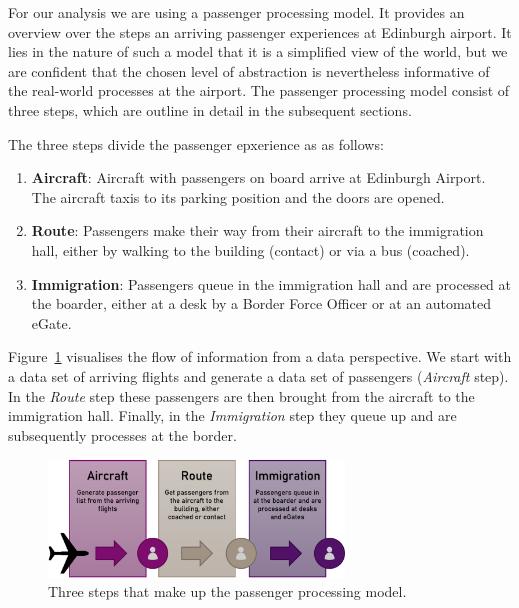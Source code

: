 \documentclass[10pt]{article}
\begin{document}
For our analysis we are using a passenger processing model. It provides an overview over the steps an arriving passenger experiences at Edinburgh airport. It lies in the nature of such a model that it is a simplified view of the world, but we are confident that the chosen level of abstraction is nevertheless informative of the real-world processes at the airport. The passenger processing model consist of three steps, which are outline in detail in the subsequent sections.

The three steps divide the passenger epxerience as as follows:
\begin{enumerate}
    \item \textbf{Aircraft}: Aircraft with passengers on board arrive at Edinburgh Airport. The aircraft taxis to its parking position and the doors are opened. \label{step:aircraft}
    \item \textbf{Route}: Passengers make their way from their aircraft to the immigration hall, either by walking to the building (contact) or via a bus (coached). \label{step:route}
    \item \textbf{Immigration}: Passengers queue in the immigration hall and are processed at the boarder, either at a desk by a Border Force Officer or at an automated eGate. \label{step:immigration}
\end{enumerate}

 Figure~\ref{fig:PPM_threesteps} visualises the flow of information from a data perspective. We start with a data set of arriving flights and generate a data set of passengers (\textit{Aircraft} step). In the \textit{Route} step these passengers are then brought from the aircraft to the immigration hall. Finally, in the \textit{Immigration} step they queue up and are subsequently processes at the border.

\begin{figure}[!ht]
    \centering
    \includegraphics[width=0.7\textwidth]{figures/ThreeSteps.png}
     \caption{Three steps that make up the passenger processing model.  } \label{fig:PPM_threesteps}
\end{figure}
\end{document}

